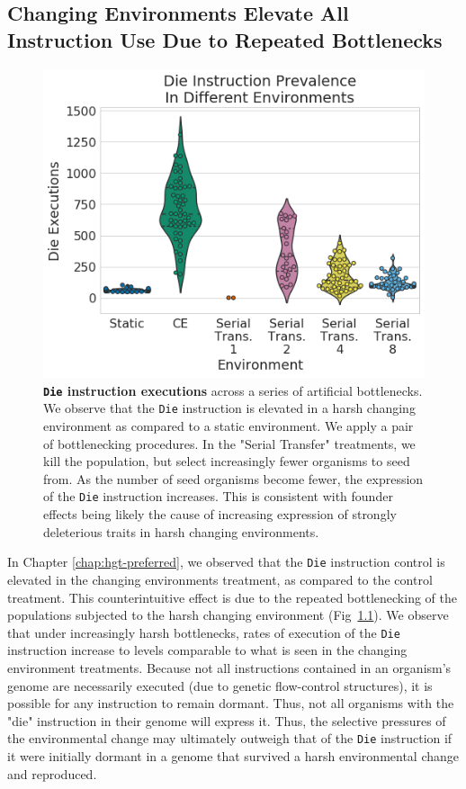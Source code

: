 \documentclass[PhD]{msu-thesis}
\begin{document}
\begin{appendices}
\chapter{Changing Environments Elevate All Instruction Use Due to Repeated Bottlenecks}
	\begin{figure}[h!]
	\begin{center}
	\includegraphics[width=0.75\columnwidth]{figures/HGT/die_bottleneck.png}
	\caption{\textbf{\texttt{Die} instruction executions} across a series of artificial bottlenecks. We observe that the \texttt{Die} instruction is elevated in a harsh changing environment as compared to a static environment. We apply a pair of bottlenecking procedures. In the "Serial Transfer" treatments, we kill the population, but select increasingly fewer organisms to seed from. As the number of seed organisms become fewer, the expression of the \texttt{Die} instruction increases. This is consistent with founder effects being likely the cause of increasing expression of strongly deleterious traits in harsh changing environments. 
	}\label{fig:bottlenecks}
	\end{center}
	\end{figure}
In Chapter \ref{chap:hgt-preferred}, we observed that the \texttt{Die} instruction control is elevated in the changing environments treatment, as compared to the control treatment. This counterintuitive effect is due to the repeated bottlenecking of the populations subjected to the harsh changing environment (Fig~\ref{fig:bottlenecks}). We observe that under increasingly harsh bottlenecks, rates of execution of the \texttt{Die} instruction increase to levels comparable to what is seen in the changing environment treatments. Because not all instructions contained in an organism's genome are necessarily executed (due to genetic flow-control structures), it is possible for any instruction to remain dormant. Thus, not all organisms with the "die" instruction in their genome will express it. Thus, the selective pressures of the environmental change may ultimately outweigh that of the \texttt{Die} instruction if it were initially dormant in a genome that survived a harsh environmental change and reproduced. 




\end{appendices}


\backmatter
\makebibliographypage
\SingleSpacing


\end{document}
